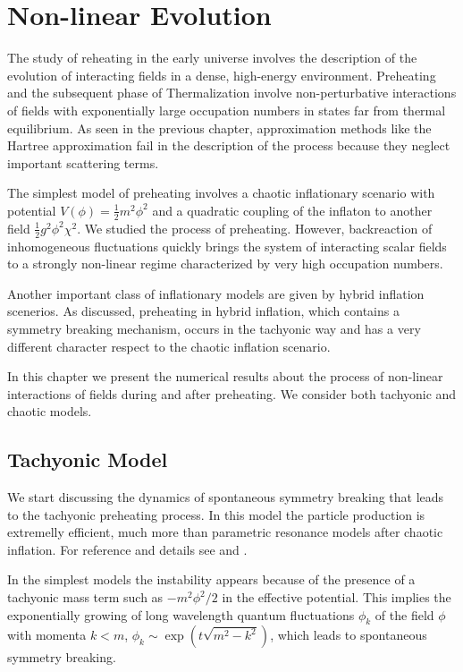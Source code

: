 \documentclass[11pt,a4paper,twoside]{book}
\begin{document}
\chapter{Non-linear Evolution}
The study of reheating in the early universe involves the description of the evolution of interacting fields in a dense, high-energy environment.  Preheating and the subsequent phase of Thermalization involve non-perturbative interactions of fields with exponentially large occupation numbers in states far from thermal equilibrium. As seen in the previous chapter, approximation methods like the Hartree approximation fail in the description of the process because they neglect important scattering terms.

The simplest model of preheating involves a chaotic inflationary scenario with potential $ V(\phi)=\frac{1}{2}m^{2}\phi^{2} $ and a quadratic coupling  of the inflaton to another field $ \frac{1}{2}g^{2}\phi^{2}\chi^{2} $. We studied the process of preheating. However, backreaction of inhomogeneous fluctuations quickly brings the system of interacting scalar fields to a strongly non-linear regime characterized  by very high occupation numbers.

Another important class of inflationary models are given by hybrid inflation scenerios. As discussed, preheating in hybrid inflation, which contains a symmetry breaking mechanism, occurs in the tachyonic way and has a very different character respect to the chaotic inflation scenario. 

In this chapter we present the numerical results about the process of non-linear interactions of fields during and after preheating. We consider both tachyonic and chaotic models.

\section{Tachyonic Model}
We start discussing the dynamics of spontaneous symmetry breaking that leads to the tachyonic preheating process. In this model the particle production is extremelly efficient, much more than  parametric resonance models after chaotic inflation. For reference and details see \cite{Chap5:DynamicsSymmetryBreaking} and \cite{Chap5:TachyonicInstability}.

In the simplest models the instability appears because of the presence of a tachyonic mass term such as $ -m^{2}\phi^{2}/2 $ in the effective potential. This implies the exponentially growing of long wavelength quantum fluctuations $\phi_{k}$ of the field $\phi$ with momenta $ k < m $, $\phi_{k} \sim \exp(t\sqrt{m^{2}-k^{2}})$, which leads to spontaneous symmetry breaking.
\end{document}
